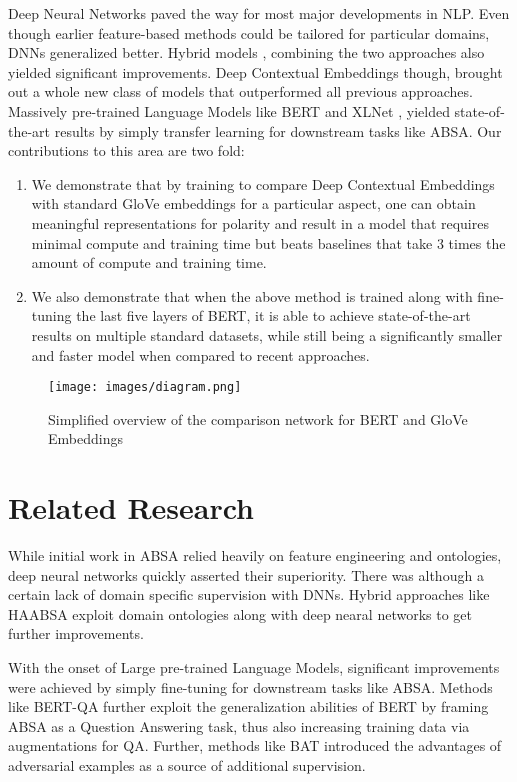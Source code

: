 \documentclass[11pt,a4paper]{article}
\begin{document}
Deep Neural Networks paved the way for most major developments in NLP. Even though earlier feature-based methods \cite{samha2014aspectbased} could be tailored for particular domains, DNNs generalized better. Hybrid models \cite{inbook}, combining the two approaches also yielded significant improvements. Deep Contextual Embeddings though, brought out a whole new class of models that outperformed all previous approaches. Massively pre-trained Language Models like BERT \cite{devlin2019bert} and XLNet \cite{yang2020xlnet}, yielded state-of-the-art results by simply transfer learning for downstream tasks like ABSA. Our contributions to this area are two fold:
\begin{enumerate}
  \item We demonstrate that by training to compare Deep Contextual Embeddings with standard GloVe embeddings \cite{pennington2014glove} for a particular aspect, one can obtain meaningful representations for polarity and result in a model that requires minimal compute and training time but beats baselines that take 3 times the amount of compute and training time.  
  \item We also demonstrate that when the above method is trained along with fine-tuning the last five layers of BERT, it is able to achieve state-of-the-art results on multiple standard datasets, while still being a significantly smaller and faster model when compared to recent approaches. 
\end{enumerate}

\begin{figure*}[h]
\centering
\texttt{[image: images/diagram.png]} 
\caption{Simplified overview of the comparison network for BERT and GloVe Embeddings}
\end{figure*}


\section{Related Research}

While initial work in ABSA \cite{samha2014aspectbased} relied heavily on feature engineering and ontologies, deep neural networks quickly asserted their superiority. There was although a certain lack of domain specific supervision with DNNs. Hybrid approaches like HAABSA \cite{inbook} exploit domain ontologies along with deep nearal networks to get further improvements. 

With the onset of Large pre-trained Language Models, significant improvements were achieved by simply fine-tuning for downstream tasks like ABSA. Methods like BERT-QA  \cite{sun2019utilizing} further exploit the generalization abilities of BERT by framing ABSA as a Question Answering task, thus also increasing training data via augmentations for QA. Further, methods like BAT \cite{karimi2020adversarial} introduced the advantages of adversarial examples as a source of additional supervision. 
\end{document}
